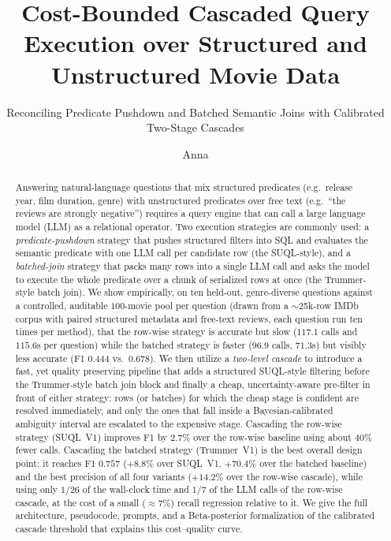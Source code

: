 \documentclass[sigconf,natbib=false]{acmart}
\begin{document}
\title{Cost-Bounded Cascaded Query Execution over Structured and Unstructured Movie Data}
\subtitle{Reconciling Predicate Pushdown and Batched Semantic Joins with Calibrated Two-Stage Cascades}

\author{Anna}

\begin{abstract}
Answering natural-language questions that mix structured predicates (e.g.\ release year, film duration, genre) with unstructured predicates over free text (e.g.\ ``the reviews are strongly negative'') requires a query engine that can call a large language model (LLM) as a relational operator. Two execution strategies are commonly used: a \emph{predicate-pushdown} strategy that pushes structured filters into SQL and evaluates the semantic predicate with one LLM call per candidate row (the SUQL-style), and a \emph{batched-join} strategy that packs many rows into a single LLM call and asks the model to execute the whole predicate over a chunk of serialized rows at once (the Trummer-style batch join). We show empirically, on ten held-out, genre-diverse questions against a controlled, auditable $100$-movie pool per question (drawn from a $\sim$25k-row IMDb corpus with paired structured metadata and free-text reviews, each question run ten times per method), that the row-wise strategy is accurate but slow ($117.1$ calls and $115.6$s per question) while the batched strategy is faster ($96.9$ calls, $71.3$s) but visibly less accurate (F1 $0.444$ vs.\ $0.678$). We then utilize a \emph{two-level cascade} to introduce a fast, yet quality preserving pipeline that adds a structured SUQL-style filtering before the Trummer-style batch join block and finally a cheap, uncertainty-aware pre-filter in front of either strategy: rows (or batches) for which the cheap stage is confident are resolved immediately, and only the ones that fall inside a Bayesian-calibrated ambiguity interval are escalated to the expensive stage. Cascading the row-wise strategy (SUQL~V1) improves F1 by $2.7\%$ over the row-wise baseline using about $40\%$ fewer calls. Cascading the batched strategy (Trummer~V1) is the best overall design point: it reaches F1 $0.757$ ($+8.8\%$ over SUQL~V1, $+70.4\%$ over the batched baseline) and the best precision of all four variants ($+14.2\%$ over the row-wise cascade), while using only $1/26$ of the wall-clock time and $1/7$ of the LLM calls of the row-wise cascade, at the cost of a small ($\approx 7\%$) recall regression relative to it. We give the full architecture, pseudocode, prompts, and a Beta-posterior formalization of the calibrated cascade threshold that explains this cost--quality curve.
\end{abstract}
\end{document}

